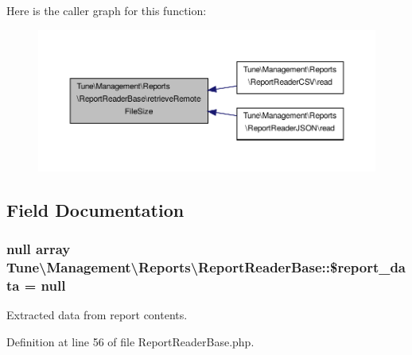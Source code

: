 Here is the caller graph for this function\-:
\nopagebreak
\begin{figure}[H]
\begin{center}
\leavevmode
\includegraphics[width=350pt]{classTune_1_1Management_1_1Reports_1_1ReportReaderBase_aa0e1e91f3872905d85a9d3fa8964a5b8_icgraph}
\end{center}
\end{figure}




\subsection{Field Documentation}
\hypertarget{classTune_1_1Management_1_1Reports_1_1ReportReaderBase_a4fd2422c90a019e4d1b7d4f4cf2e1541}{
\subsubsection[{\$report\-\_\-data}]{\setlength{\rightskip}{0pt plus 5cm}null array Tune\textbackslash{}\-Management\textbackslash{}\-Reports\textbackslash{}\-Report\-Reader\-Base\-::\$report\-\_\-data = null\hspace{0.3cm}{\ttfamily [protected]}}}\label{classTune_1_1Management_1_1Reports_1_1ReportReaderBase_a4fd2422c90a019e4d1b7d4f4cf2e1541}


Extracted data from report contents. 



Definition at line 56 of file Report\-Reader\-Base.\-php.

